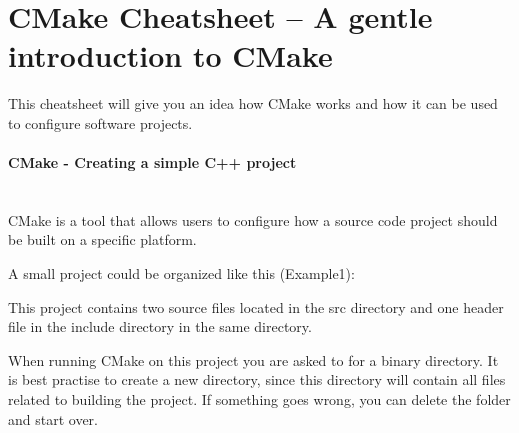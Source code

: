 \documentclass[11pt,a4paper,landscape]{scrartcl} %
\newcommand{\sectiontitle}[1]{\paragraph{#1} \ \\} %
\begin{document}


\section*{CMake Cheatsheet -- A gentle introduction to CMake} %



\setlength{\columnsep}{1.5cm}
\begin{multicols}{2}


This cheatsheet will give you an idea how CMake works and how it can be used to configure software projects.

\sectiontitle{CMake - Creating a simple C++ project}
			 
CMake is a tool that allows users to configure how a source code project should be built on a specific platform. 

A small project could be organized like this (Example1): 

\vspace{\baselineskip} %

\noindent{}

\vspace{\baselineskip} %

This project contains two source files located in the src directory and one header file in the include directory in the same directory.

When running CMake on this project you are asked to for a binary directory. It is best practise to create a new directory, since this directory will contain all files related to building the project. If something goes wrong, you can delete the folder and start over.


\end{multicols}
\end{document}
